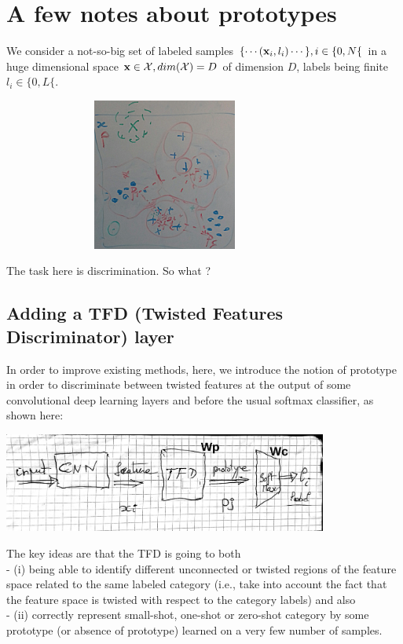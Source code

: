 \documentclass{article}\usepackage[width=17cm,height=22cm]{geometry}\usepackage[english]{babel} \usepackage[utf8]{inputenc}\usepackage{fancyvrb} \usepackage{authblk} \usepackage{amsmath}\usepackage{amsfonts} \usepackage{hyperref}\usepackage{outlines} \usepackage{graphicx} \usepackage{color}\DeclareGraphicsExtensions{.pdf,.png,.jpg}\definecolor{vthierry}{RGB}{80,0,120}\newcommand{\vthierry}[1]{{\color{vthierry}{#1}}}\definecolor{thalita}{RGB}{51, 153, 255}\newcommand{\thalita}[1]{{\color{thalita}{#1}}}
\begin{document}
\section*{A few notes about prototypes}

We consider a not-so-big set of labeled samples $\{ \cdots ({\bf x}_i, l_i) \cdots \}, i \in \{0, N\{$ in a huge dimensional space ${\bf x} \in {\cal X}, dim({\cal X}) = D$ of dimension $D$, labels being finite $l_i \in \{0, L\{$. 

\begin{center}\includegraphics[width=0.8\textwidth,height=5cm]{img/20170920_163743}\end{center}

The task here is discrimination. So what ?

\subsection*{Adding a TFD (Twisted Features Discriminator) layer}

In order to improve existing methods, here, we introduce the notion of prototype in order to discriminate between twisted features at the output of some convolutional deep learning layers and before the usual softmax classifier, as shown here:

\begin{center}\includegraphics[width=0.8\textwidth]{img/20170923_114401}\end{center}

The key ideas are that the TFD is going to both \\ - (i) being able to identify different unconnected or twisted regions of the feature space related to the same labeled category (i.e., take into account the fact that the feature space is twisted with respect to the category labels) and also \\ - (ii) correctly represent small-shot, one-shot or zero-shot category by some prototype (or absence of prototype) learned on a very few number of samples.
\end{document}
